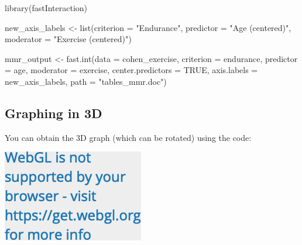 \documentclass[
]{krantz}
\makeatletter
\newenvironment{Shaded}{\begin{snugshade}}{\end{snugshade}}
\newcommand{\AttributeTok}[1]{\textcolor[rgb]{0.61,0.61,0.61}{#1}}
\newcommand{\ConstantTok}[1]{\textcolor[rgb]{0,0,0}{#1}}
\newcommand{\FunctionTok}[1]{\textcolor[rgb]{0,0,0}{#1}}
\newcommand{\NormalTok}[1]{#1}
\newcommand{\OtherTok}[1]{\textcolor[rgb]{0.37,0.37,0.37}{#1}}
\newcommand{\SpecialCharTok}[1]{\textcolor[rgb]{0,0,0}{#1}}
\newcommand{\StringTok}[1]{\textcolor[rgb]{0.5,0.5,0.5}{#1}}
\newenvironment{kframe}{%
\medskip{}
\setlength{\fboxsep}{.8em}
 \def\at@end@of@kframe{}%
 \ifinner\ifhmode%
  \def\at@end@of@kframe{\end{minipage}}%
  \begin{minipage}{\columnwidth}%
 \fi\fi%
 \def\FrameCommand##1{\hskip\@totalleftmargin \hskip-\fboxsep
 \colorbox{shadecolor}{##1}\hskip-\fboxsep
     \hskip-\linewidth \hskip-\@totalleftmargin \hskip\columnwidth}%
 \MakeFramed {\advance\hsize-\width
   \@totalleftmargin\z@ \linewidth\hsize
   \@setminipage}}%
 {\par\unskip\endMakeFramed%
 \at@end@of@kframe}
\renewenvironment{Shaded}{\begin{kframe}}{\end{kframe}}
\makeatother
\begin{document}
\begin{Shaded}
\begin{Highlighting}[]
\FunctionTok{library}\NormalTok{(fastInteraction)}

\NormalTok{new\_axis\_labels }\OtherTok{\textless{}{-}} \FunctionTok{list}\NormalTok{(}\AttributeTok{criterion =} \StringTok{"Endurance"}\NormalTok{,}
                        \AttributeTok{predictor =} \StringTok{"Age (centered)"}\NormalTok{,}
                        \AttributeTok{moderator =} \StringTok{"Exercise (centered)"}\NormalTok{)}

\NormalTok{mmr\_output }\OtherTok{\textless{}{-}} \FunctionTok{fast.int}\NormalTok{(}\AttributeTok{data =}\NormalTok{ cohen\_exercise,}
                       \AttributeTok{criterion =}\NormalTok{ endurance,}
                       \AttributeTok{predictor =}\NormalTok{ age,}
                       \AttributeTok{moderator =}\NormalTok{ exercise,}
                       \AttributeTok{center.predictors =} \ConstantTok{TRUE}\NormalTok{,}
                       \AttributeTok{axis.labels =}\NormalTok{ new\_axis\_labels,}
                       \AttributeTok{path =} \StringTok{"tables\_mmr.doc"}\NormalTok{)}
\end{Highlighting}
\end{Shaded}

\hypertarget{graphing-in-3d}{%
\subsection{Graphing in 3D}\label{graphing-in-3d}}

You can obtain the 3D graph (which can be rotated) using the code:

\begin{Shaded}
\end{Shaded}

\includegraphics{bookdown_files/figure-latex/unnamed-chunk-505-1.png}
\end{document}
